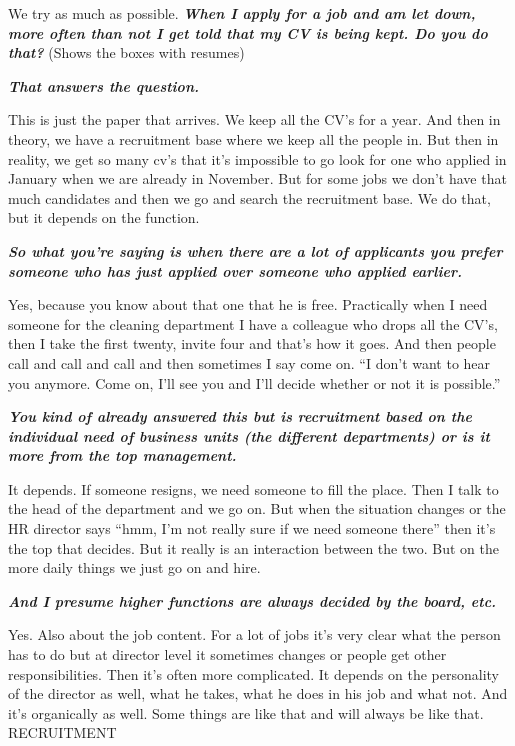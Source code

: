 \documentclass[a4paper,fleqn,11pt,dvips,titlepage]{article}
\newcommand{\question}[1]{\textbf{\textit{#1}}}
\numberwithin{figure}{section}
\numberwithin{equation}{section}
\begin{document}
 We try as much as possible. 
 \question{ When I apply for a job and am let down, more often than not I get told that my CV is being kept. Do you do that?}
(Shows the boxes with resumes) 

\question{That answers the question.}

This is just the paper that arrives. We keep all the CV’s for a year. And then in theory, we have a recruitment base where we keep all the people in. But then in reality, we get so many cv’s that it’s impossible to go look for one who applied in January when we are already in November. But for some jobs we don’t have that much candidates and then we go and search the recruitment base. We do that, but it depends on the function. 

\question{So what you’re saying is when there are a lot of applicants you prefer someone who has just applied over someone who applied earlier.}

Yes, because you know about that one that he is free. Practically when I need someone for the cleaning department I have a colleague who drops all the CV’s, then I take the first twenty, invite four and that’s how it goes. And then people call and call and call and then sometimes I say come on. “I don’t want to hear you anymore. Come on, I’ll see you and I’ll decide whether or not it is possible.”

\question{You kind of already answered this but is recruitment based on the individual need of business units (the different departments) or is it more from the top management.}

It depends. If someone resigns, we need someone to fill the place. Then I talk to the head of the department and we go on. But when the situation changes or the HR director says “hmm, I’m not really sure if we need someone there” then it’s the top that decides. But it really is an interaction between the two. But on the more daily things we just go on and hire. 

\question{And I presume higher functions are always decided by the board, etc.}

Yes. Also about the job content. For a lot of jobs it’s very clear what the person has to do but at director level it sometimes changes or people get other responsibilities. Then it’s often more complicated. It depends on the personality of the director as well, what he takes, what he does in his job and what not. And it’s organically as well. Some things are like that and will always be like that.
RECRUITMENT
\end{document}
